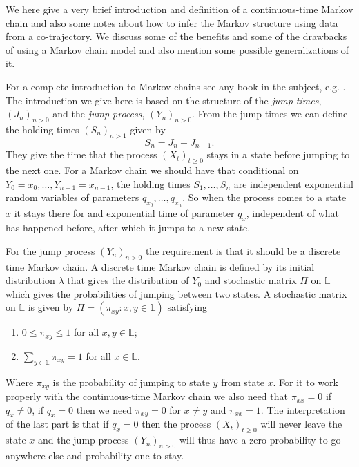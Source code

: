 \documentclass[12pt]{article}
\newcommand{\locset}{\mathbb{L}}
\theoremstyle{definition}
\begin{document}
We here give a very brief introduction and definition of a
continuous-time Markov chain and also some notes about how to infer
the Markov structure using data from a co-trajectory. We discuss some
of the benefits and some of the drawbacks of using a Markov chain
model and also mention some possible generalizations of it.

For a complete introduction to Markov chains see any book in the
subject, e.g. \cite{norris_markov_1997}. The introduction we give here
is based on the structure of the \emph{jump times},
\((J_{n})_{n > 0}\) and the \emph{jump process}, \((Y_{n})_{n > 0}\).
From the jump times we can define the holding times
\((S_{n})_{n > 1}\) given by
\begin{equation*}
  S_{n} = J_{n} - J_{n - 1}.
\end{equation*}
They give the time that the process \((X_{t})_{t \geq 0}\) stays in a
state before jumping to the next one. For a Markov chain we should
have that conditional on \(Y_{0} = x_{0},\dots, Y_{n - 1} = x_{n-1}\),
the holding times \(S_{1},\dots, S_{n}\) are independent exponential
random variables of parameters \(q_{x_{0}},\dots, q_{x_{n}}\). So when
the process comes to a state \(x\) it stays there for and exponential
time of parameter \(q_{x}\), independent of what has happened before,
after which it jumps to a new state.

For the jump process \((Y_{n})_{n > 0}\) the requirement is that it
should be a discrete time Markov chain. A discrete time Markov chain
is defined by its initial distribution \(\lambda\) that gives the
distribution of \(Y_{0}\) and stochastic matrix \(\Pi\) on \(\locset\)
which gives the probabilities of jumping between two states. A
stochastic matrix on \(\locset\) is given by
\(\Pi = (\pi_{xy}: x,y \in \locset)\) satisfying
\begin{enumerate}
\item \(0 \leq \pi_{xy} \leq 1\) for all \(x, y \in \locset\);
\item \(\sum_{y \in \locset} \pi_{xy} = 1\) for all \(x \in \locset\).
\end{enumerate}
Where \(\pi_{xy}\) is the probability of jumping to state \(y\) from
state \(x\). For it to work properly with the continuous-time Markov
chain we also need that \(\pi_{xx} = 0\) if \(q_{x} \not= 0\), if
\(q_{x} = 0\) then we need \(\pi_{xy} = 0\) for \(x \not= y\) and
\(\pi_{xx} = 1\). The interpretation of the last part is that if
\(q_{x} = 0\) then the process \((X_{t})_{t \geq 0}\) will never leave
the state \(x\) and the jump process \((Y_{n})_{n > 0}\) will thus
have a zero probability to go anywhere else and probability one to
stay.
\end{document}
